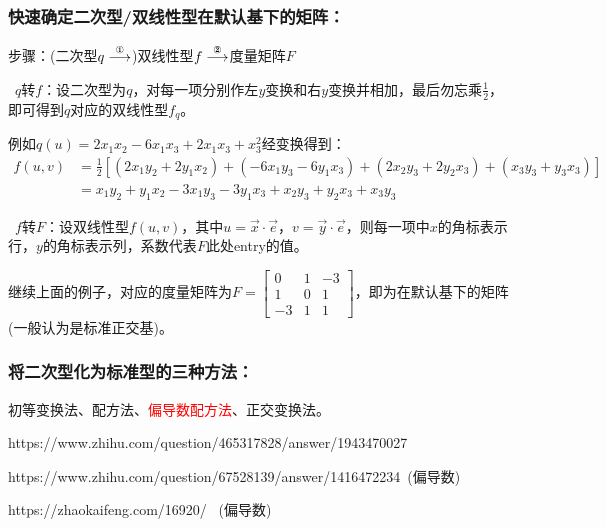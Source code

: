 \documentclass[zihao=-4,UTF8]{report}
\theoremstyle{mystyle} %
\begin{document}
\subsubsection{快速确定二次型/双线性型在默认基下的矩阵：}
步骤：(二次型$q\overset{\text{\ding{172}}}{\longrightarrow}$)双线性型$f\overset{\text{\ding{173}}}{\longrightarrow}$度量矩阵$F$\par
{}\ $q$转$f$：设二次型为$q$，对每一项分别作左$y$变换和右$y$变换并相加，最后{\color{red}勿忘乘$\frac{1}{2}$}，即可得到$q$对应的双线性型$f_q$。\par{\color{gray}\small 例如$q(u) = 2x_1x_2 -6x_1x_3+2x_1x_3+x_3^2$经变换得到：
\begin{align*}
    f(u,v) &= \frac{1}{2}\left[(2x_1y_2 + 2y_1x_2)+(-6x_1y_3-6y_1x_3)+(2x_2y_3+2y_2x_3)+(x_3y_3 +y_3x_3) \right]\\
    & = x_1y_2 + y_1x_2 -3x_1y_3-3y_1x_3 +x_2y_3+y_2x_3 +x_3y_3
\end{align*}\noindent
}\par
{}\ $f$转$F$：设双线性型$f(u,v)$，其中$u = \vec{x}\cdot \vec{e}$，$v =\vec{y}\cdot \vec{e}$，则每一项中$x$的角标表示行，$y$的角标表示列，系数代表$F$此处entry的值。\par 
{\color{gray}\small 继续上面的例子，对应的度量矩阵为$F = 
\begin{bmatrix}  
    0 & 1 & -3 \\  
    1 & 0 & 1 \\  
    -3 & 1 & 1  
  \end{bmatrix} $，即为在默认基下的矩阵(一般认为是标准正交基)。}

\subsubsection{将二次型化为标准型的三种方法：}
初等变换法、配方法、\textcolor{red}{偏导数配方法}、正交变换法。\par 
https://www.zhihu.com/question/465317828/answer/1943470027 \par
https://www.zhihu.com/question/67528139/answer/1416472234\ (偏导数)\par
https://zhaokaifeng.com/16920/ \ (偏导数)\par
\end{document}
